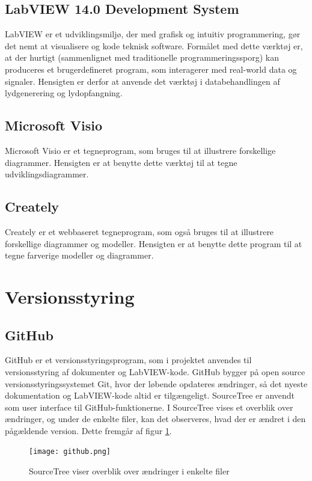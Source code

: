 	\subsection{LabVIEW 14.0 Development System}
	LabVIEW er et udviklingsmiljø, der med grafisk og intuitiv programmering, gør det nemt at visualisere og kode teknisk software. Formålet med dette værktøj er, at der hurtigt (sammenlignet med traditionelle programmeringssporg) kan produceres et brugerdefineret program, som interagerer med real-world data og signaler. Hensigten er derfor at anvende det værktøj i databehandlingen af lydgenerering og lydopfangning. 
	
	\subsection{Microsoft Visio}   
	Microsoft Visio er et tegneprogram, som bruges til at illustrere forskellige diagrammer. Hensigten er at benytte dette værktøj til at tegne udviklingsdiagrammer.
	
	\subsection{Creately}
	Creately er et webbaseret tegneprogram, som også bruges til at illustrere forskellige diagrammer og modeller. Hensigten er at benytte dette program til at tegne farverige modeller og diagrammer. 
	
\section{Versionsstyring}
\subsection{GitHub}
GitHub er et versionsstyringsprogram, som i projektet anvendes til versionsstyring af dokumenter og LabVIEW-kode. GitHub
bygger på open source versionsstyringssystemet Git, hvor der løbende opdateres ændringer, så det nyeste dokumentation og LabVIEW-kode altid er tilgængeligt. SourceTree er anvendt som user interface til GitHub-funktionerne. I SourceTree vises et overblik over ændringer, og under de enkelte filer, kan det observeres, hvad der er ændret i den pågældende version. Dette fremgår af figur \ref{fig:git}. 

\begin{figure}[htb]
\centering
\texttt{[image: github.png]}
\caption{SourceTree viser overblik over ændringer i enkelte filer}
\label{fig:git}	
\end{figure}

